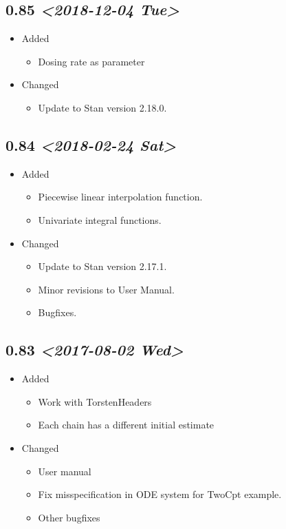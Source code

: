 \documentclass[11pt, reqno, oneside]{amsbook}
\numberwithin{equation}{chapter}
\numberwithin{figure}{chapter}
\numberwithin{table}{chapter}
\theoremstyle{remark}
\begin{document}
\subsection{0.85 \textit{<2018-12-04 Tue>}}
\label{sec:org2289356}
\begin{itemize}
\item Added
\label{sec:orgbfbefa3}
\begin{itemize}
\item Dosing rate as parameter
\end{itemize}
\item Changed
\label{sec:org02ec4a5}
\begin{itemize}
\item Update to Stan version 2.18.0.
\end{itemize}
\end{itemize}

\subsection{0.84 \textit{<2018-02-24 Sat>}}
\label{sec:org3ac217b}
\begin{itemize}
\item Added
\label{sec:orgd64e150}
\begin{itemize}
\item Piecewise linear interpolation function.
\item Univariate integral functions.
\end{itemize}

\item Changed
\label{sec:orgd6581e3}
\begin{itemize}
\item Update to Stan version 2.17.1.
\item Minor revisions to User Manual.
\item Bugfixes.
\end{itemize}
\end{itemize}

\subsection{0.83 \textit{<2017-08-02 Wed>}}
\label{sec:orgbb6dd8b}
\begin{itemize}
\item Added
\label{sec:org2b00beb}
\begin{itemize}
\item Work with TorstenHeaders
\item Each chain has a different initial estimate
\end{itemize}

\item Changed
\label{sec:orgbf33d4a}
\begin{itemize}
\item User manual
\item Fix misspecification in ODE system for TwoCpt example.
\item Other bugfixes
\end{itemize}
\end{itemize}
\end{document}
